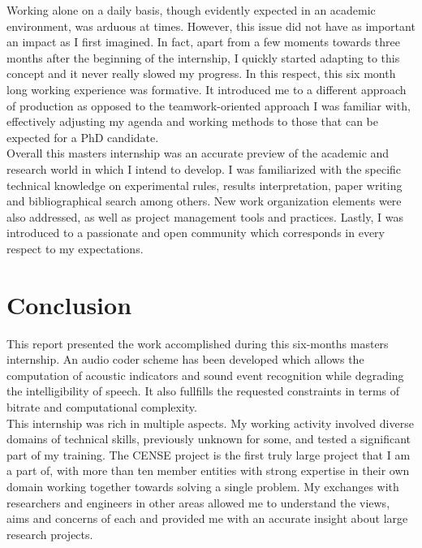 \documentclass[12pt,times,onecolumn]{article}
\begin{document}
Working alone on a daily basis, though evidently expected in an academic environment, was arduous at times. However, this issue did not have as important an impact as I first imagined. In fact, apart from a few moments towards three months after the beginning of the internship, I quickly started adapting to this concept and it never really slowed my progress. In this respect, this six month long working experience was formative. It introduced me to a different approach of production as opposed to the teamwork-oriented approach I was familiar with, effectively adjusting my agenda and working methods to those that can be expected for a PhD candidate.\\

Overall this masters internship was an accurate preview of the academic and research world in which I intend to develop. I was familiarized with the specific technical knowledge on experimental rules, results interpretation, paper writing and bibliographical search among others. New work organization elements were also addressed, as well as project management tools and practices. Lastly, I was introduced to a passionate and open community which corresponds in every respect to my expectations.\\


\clearpage
\section*{Conclusion}
This report presented the work accomplished during this six-months masters internship. An audio coder scheme has been developed which allows the computation of acoustic indicators and sound event recognition while degrading the intelligibility of speech. It also fullfills the requested constraints in terms of bitrate and computational complexity.\\


This internship was rich in multiple aspects. My working activity involved diverse domains of technical skills, previously unknown for some, and tested a significant part of my training. The CENSE project is the first truly large project that I am a part of, with more than ten member entities with strong expertise in their own domain working together towards solving a single problem. My exchanges with researchers and engineers in other areas allowed me to understand the views, aims and concerns of each and provided me with an accurate insight about large research projects.\\
\end{document}
